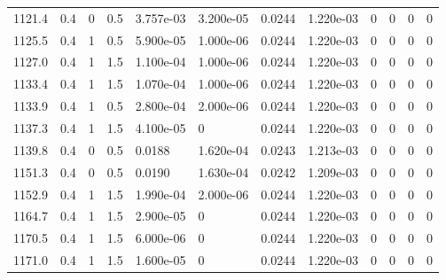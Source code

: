 \documentclass[preview]{standalone}
\begin{document}
{{{{{{{\begin{tabular}{L{1.2cm}C{1.2cm} C{0.3cm}C{0.5cm} C{1.4cm}C{1.4cm} C{1.4cm}C{1.4cm} C{1.6cm}C{1.6cm} C{1.6cm}C{1.6cm}}
  1121.4  &   0.4  & 0     & 0.5 &  3.757e-03  & 3.200e-05  &  0.0244&   1.220e-03& 0 & 0   &  0 & 0  \\ 
  1125.5  &   0.4  & 1     & 0.5 &  5.900e-05  & 1.000e-06  &  0.0244&   1.220e-03& 0 & 0   &  0 & 0  \\ 
  1127.0  &   0.4  & 1     & 1.5 &  1.100e-04  & 1.000e-06  &  0.0244&   1.220e-03& 0 & 0   &  0 & 0  \\ 
  1133.4  &   0.4  & 1     & 1.5 &  1.070e-04  & 1.000e-06  &  0.0244&   1.220e-03& 0 & 0   &  0 & 0  \\ 
  1133.9  &   0.4  & 1     & 0.5 &  2.800e-04  & 2.000e-06  &  0.0244&   1.220e-03& 0 & 0   &  0 & 0  \\ 
  1137.3  &   0.4  & 1     & 1.5 &  4.100e-05  & 0  &  0.0244&   1.220e-03& 0 & 0   &  0 & 0  \\ 
  1139.8  &   0.4  & 0     & 0.5 &  0.0188  & 1.620e-04  &  0.0243&   1.213e-03& 0 & 0   &  0 & 0  \\ 
  1151.3  &   0.4  & 0     & 0.5 &  0.0190  & 1.630e-04  &  0.0242&   1.209e-03& 0 & 0   &  0 & 0  \\ 
  1152.9  &   0.4  & 1     & 1.5 &  1.990e-04  & 2.000e-06  &  0.0244&   1.220e-03& 0 & 0   &  0 & 0  \\ 
  1164.7  &   0.4  & 1     & 1.5 &  2.900e-05  & 0  &  0.0244&   1.220e-03& 0 & 0   &  0 & 0  \\ 
  1170.5  &   0.4  & 1     & 1.5 &  6.000e-06  & 0  &  0.0244&   1.220e-03& 0 & 0   &  0 & 0  \\ 
  1171.0  &   0.4  & 1     & 1.5 &  1.600e-05  & 0  &  0.0244&   1.220e-03& 0 & 0   &  0 & 0  \\ 
\hline 
\end{tabular} 

}}}}}}}
\end{document}
